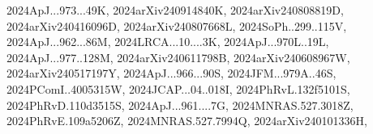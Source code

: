 \documentclass[12pt]{article}
\begin{document}
\begin{description}
{2024ApJ...973...49K,%
2024arXiv240914840K,%
2024arXiv240808819D,%
2024arXiv240416096D,%
2024arXiv240807668L,%
2024SoPh..299..115V,%
2024ApJ...962...86M,%
2024LRCA...10....3K,%
2024ApJ...970L..19L,%
2024ApJ...977..128M,%
2024arXiv240611798B,%
2024arXiv240608967W,%
2024arXiv240517197Y,%
2024ApJ...966...90S,%
2024JFM...979A..46S,%
2024PComI..4005315W,%
2024JCAP...04..018I,%
2024PhRvL.132f5101S,%
2024PhRvD.110d3515S,%
2024ApJ...961....7G,%
2024MNRAS.527.3018Z,%
2024PhRvE.109a5206Z,%
2024MNRAS.527.7994Q,%
2024arXiv240101336H,%
}
\end{description}
\end{document}
